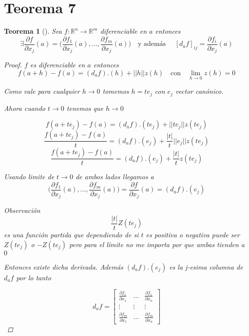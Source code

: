 \documentclass{article}
\theoremstyle{break}
\newtheorem{theorem}{Teorema}[section]
\begin{document}
\section{Teorema 7}
\begin{theorem}[]
  Sea $f:\mathbb{R}^{n} \longrightarrow  \mathbb{R}^{m} $ diferenciable en $a$ entonces
  $$\exists \frac{\partial f}{\partial x_j} (a) = \bigg( \frac{\partial f_1}{\partial x_j} (a),\ldots
  ,\frac{\partial f_m}{\partial x_j} (a) \bigg ) \quad \text{y además }\quad 
  [d_a f]_{ij} = \frac{\partial f_i}{\partial x_j} (a) $$
  \begin{proof}
    $f$ es diferenciable en $a$ entonces 
    $$ f(a+h) - f(a) = (d_a f).(h)+ ||h||z(h) \quad \text{con}\quad \lim_{h \rightarrow 0 } z(h) = 0$$

    Como vale para cualquier $h \rightarrow 0 $ tomemos $h  = t e_j$ con $e_j$ vector canónico. 

    Ahora cuando $t \rightarrow 0 $ tenemos que $h \rightarrow 0 $

    $$ f(a+te_j) - f(a) = (d_a f).(te_j)+ ||te_j||z(te_j) $$
    $$ \frac{f(a+te_j) - f(a)}{t} = (d_a f).(e_j)+ \frac{|t|}{t}||e_j||z(te_j) $$
    $$ \frac{f(a+te_j) - f(a)}{t} = (d_a f).(e_j)+ \frac{|t|}{t}z(te_j) $$

    Usando limite de $t \rightarrow 0 $ de ambos lados llegamos a 
    $$\bigg( \frac{\partial f_1}{\partial x_j} (a),\ldots
  ,\frac{\partial f_m}{\partial x_j} (a) \bigg ) = \frac{\partial f}{\partial x_j}(a) = (d_a f).(e_j)$$

    Observación $$\frac{|t|}{t} Z(te_j)$$ es una función partida que dependiendo de si $t$ es positiva o 
    negativa puede ser $Z(te_j)$ o $-Z(te_j)$ pero para el límite no me importa por que ambas tienden a $0$
    
    Entonces existe dicha derivada. Además $(d_a f).(e_j)$ es la j-esima columna de $d_a f$ por lo tanto

    $$ d_a f=
    \begin{bmatrix}
      \frac{\partial f_1}{\partial x_1} & \ldots & \frac{\partial f_1}{\partial x_n} \\
      \vdots & \vdots & \vdots \\
      \frac{\partial f_m}{\partial x_1} & \ldots & \frac{\partial f_m}{\partial x_n}
    \end{bmatrix}
    $$

  \end{proof}
\end{theorem}
\end{document}
